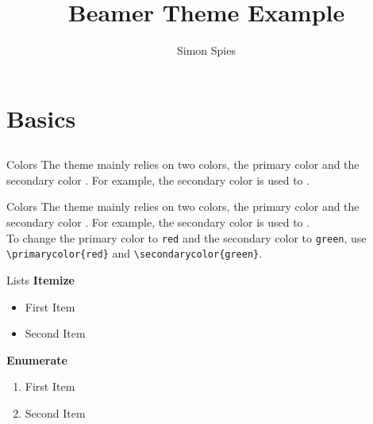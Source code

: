 \documentclass{beamer}
\title{Beamer Theme Example}
\author{Simon Spies}
\begin{document}
\begin{frame}[plain]
    \maketitle
\end{frame} 

\section{Basics}
\subsection{}

\begin{frame}{Colors}
    The theme mainly relies on two colors, the primary color 
    and the secondary color . For example, the secondary color 
    is used to .\\[2em]

\end{frame}


{
    \begin{frame}[fragile]{Colors}
        The theme mainly relies on two colors, the primary color 
        and the secondary color . For example, the secondary color 
        is used to .\\[2em]

        To change the primary color to \texttt{red} and the secondary color to \verb|green|,
        use \verb|\primarycolor{red}| and \verb|\secondarycolor{green}|. 
    \end{frame}
}

\begin{frame}{Lists}
    \textbf{Itemize}
    \begin{itemize}
        \item First Item
        \item Second Item
    \end{itemize}
    
    \vspace{2em}
    \textbf{Enumerate}
    \begin{enumerate}
        \item First Item
        \item Second Item
    \end{enumerate}
\end{frame}
    
\end{document}
